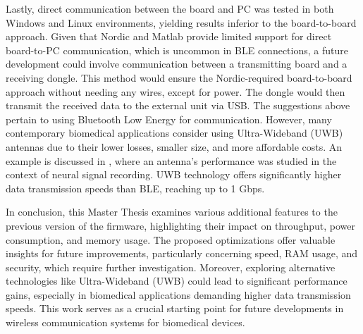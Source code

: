 \documentclass{Configuration_Files/PoliMi3i_thesis}
\begin{document}
Lastly, direct communication between the board and PC was tested in both Windows and Linux environments, yielding results inferior to the board-to-board approach. Given that Nordic and Matlab provide limited support for direct board-to-PC communication, which is uncommon in BLE connections, a future development could involve communication between a transmitting board and a receiving dongle. This method would ensure the Nordic-required board-to-board approach without needing any wires, except for power. The dongle would then transmit the received data to the external unit via USB.
The suggestions above pertain to using Bluetooth Low Energy for communication. However, many contemporary biomedical applications consider using Ultra-Wideband (UWB) antennas due to their lower losses, smaller size, and more affordable costs. An example is discussed in \cite{patwary2020modeling}, where an antenna's performance was studied in the context of neural signal recording. UWB technology offers significantly higher data transmission speeds than BLE, reaching up to 1 Gbps.

In conclusion, this Master Thesis examines various additional features to the previous version of the firmware, highlighting their impact on throughput, power consumption, and memory usage. The proposed optimizations offer valuable insights for future improvements, particularly concerning speed, RAM usage, and security, which require further investigation. Moreover, exploring alternative technologies like Ultra-Wideband (UWB) could lead to significant performance gains, especially in biomedical applications demanding higher data transmission speeds. This work serves as a crucial starting point for future developments in wireless communication systems for biomedical devices.
\end{document}
